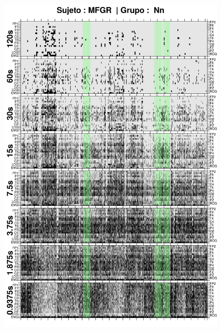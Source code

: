 \begin{figure}
\centering
\includegraphics[width=0.9\linewidth]
{./img_ejemplos/GURM251148SUE_comp_est_.png} 
\end{figure}
